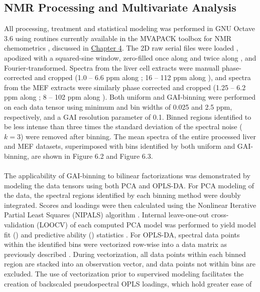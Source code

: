 \subsection{NMR Processing and Multivariate Analysis}

\begin{doublespace}
All processing, treatment and statistical modeling was performed in GNU Octave
3.6 \cite{eaton2008} using routines currently available in the MVAPACK
toolbox for NMR chemometrics \cite{worley:acscb2014}, discussed in
\hyperlink{chapter.4}{Chapter 4}. The 2D raw serial files were loaded
\cite{delaglio:jbnmr1995}, apodized with a squared-sine window,
zero-filled once along \hnmr and twice along \cnmr, and Fourier-transformed.
Spectra from the liver cell extracts were manuall phase-corrected and cropped
(1.0 -- 6.6 ppm along \hnmr; 16 -- 112 ppm along \cnmr), and spectra from the
MEF extracts were similarly phase corrected and cropped (1.25 -- 6.2 ppm along
\hnmr; 8 -- 102 ppm along \cnmr). Both uniform and GAI-binning were performed
on each data tensor using minimum \hnmr and \cnmr bin widths of 0.025 and 2.5
ppm, respectively, and a GAI resolution parameter of 0.1. Binned regions
identified to be less intense than three times the standard deviation of the
spectral noise ($k = 3$) were removed after binning. The mean spectra of the
entire processed liver and MEF datasets, superimposed with bins identified by
both uniform and GAI-binning, are shown in Figure 6.2 and Figure 6.3.
\\\\
The applicability of GAI-binning to bilinear factorizations was demonstrated
by modeling the data tensors using both PCA and OPLS-DA. For PCA modeling of
the data, the spectral regions identified by each binning method were doubly
integrated. Scores and loadings were then calculated using the Nonlinear
Iterative Partial Least Squares (NIPALS) algorithm
\cite{jolliffe2002}. Internal leave-one-out cross-validation (LOOCV)
of each computed PCA model was performed to yield model fit (\rsqx) and
predictive ability (\qsq) statistics
\cite{krzanowski:biom1987,eshghi:cils2014}. For OPLS-DA, spectral data
points within the identified bins were vectorized row-wise into a data matrix
as previously described \cite{hedenstrom:cils2008}. During
vectorization, all data points within each binned region are stacked into an
observation vector, and data points not within bins are excluded. The use of
vectorization prior to supervised modeling facilitates the creation of
backscaled pseudospectral OPLS loadings, which hold greater ease of

\end{doublespace}
